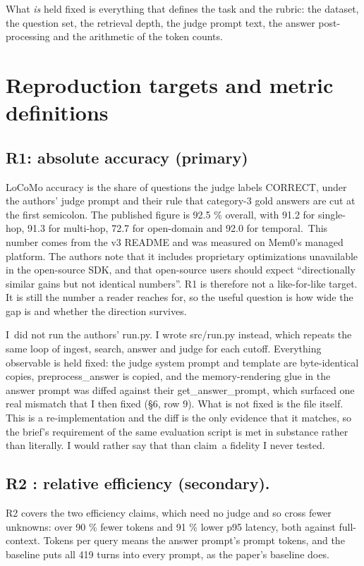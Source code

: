 \documentclass[11pt,a4paper]{article}
\begin{document}
What \emph{is} held fixed is everything that defines the task and the rubric: the dataset, the question set, the retrieval depth, the judge prompt text, the answer post-processing and the arithmetic of the token counts.

\section{Reproduction targets and metric definitions}

\subsection{R1: absolute accuracy (primary)}

LoCoMo accuracy is the share of questions the judge labels CORRECT, under the authors' judge prompt and their rule that category-3 gold answers are cut at the first semicolon. The published figure is 92.5 \% overall, with 91.2 for single-hop, 91.3 for multi-hop, 72.7 for open-domain and 92.0 for temporal.~This number comes from the v3 README and was measured on Mem0's managed platform. The authors note that it includes proprietary optimizations unavailable in the open-source SDK, and that open-source users should expect ``directionally similar gains but not identical numbers''. R1 is therefore not a like-for-like target. It is still the number a reader reaches for, so the useful question is how wide the gap is and whether the direction survives.

I~did not run the authors' run.py. I wrote src/run.py instead, which repeats the same loop of ingest, search, answer and judge for each cutoff. Everything observable is held fixed: the judge system prompt and template are byte-identical copies, preprocess\_answer is copied, and the memory-rendering glue in the answer prompt was diffed against their get\_answer\_prompt, which surfaced one real mismatch that I then fixed (§6, row 9). What is not fixed is the file itself. This is a re-implementation and the diff is the only evidence that it matches, so the brief's requirement of the same evaluation script is met in substance rather than literally. I would rather say that than claim~a fidelity I never tested.

\subsection{R2 : relative efficiency (secondary).}

R2 covers the two efficiency claims, which need no judge and so cross fewer unknowns: over 90 \% fewer tokens and 91 \% lower p95 latency, both against full-context. Tokens per query means the answer prompt's prompt tokens, and the baseline puts all 419 turns into every prompt, as the paper's baseline does.
\end{document}
